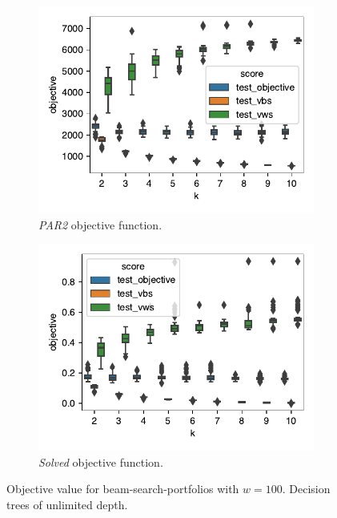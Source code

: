 \documentclass[conference]{IEEEtran}
\begin{document}
\begin{figure}[htb]
	\centering
	\begin{subfigure}{0.98\columnwidth}
		\centering
		\includegraphics[width=\columnwidth]{plots/objective-prediction-PAR2.pdf}
		\caption{\emph{PAR2} objective function.}
		\label{fig:objective-prediction-PAR2}
	\end{subfigure}
	\hfill
	\begin{subfigure}{0.98\columnwidth}
		\centering
		\includegraphics[width=\columnwidth]{plots/objective-prediction-solved.pdf}
		\caption{\emph{Solved} objective function.}
		\label{fig:objective-prediction-solved}
	\end{subfigure}
	\caption{Objective value for beam-search-portfolios with $w=100$. Decision trees of unlimited depth.}
	\label{fig:objective-prediction}
\end{figure}
\end{document}
